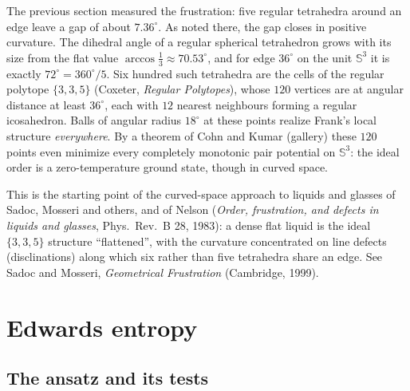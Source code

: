 \documentclass[11pt,openany]{book}
\theoremstyle{plain}
\theoremstyle{definition}
\theoremstyle{remark}
\newcommand{\Sph}{\mathbb{S}}          %
\begin{document}
The previous section measured the frustration: five regular tetrahedra around an edge leave a gap of
about $7.36^\circ$. As noted there, the gap closes in positive curvature. The dihedral angle of a regular
spherical tetrahedron grows with its size from the flat value $\arccos\frac13\approx70.53^\circ$, and for
edge $36^\circ$ on the unit $\Sph^3$ it is exactly $72^\circ=360^\circ/5$. Six hundred such tetrahedra are the cells of the
regular polytope $\{3,3,5\}$ (Coxeter, \emph{Regular Polytopes}), whose $120$ vertices are at angular
distance at least $36^\circ$, each with $12$ nearest neighbours forming a regular icosahedron. Balls of
angular radius $18^\circ$ at these points realize Frank's local structure \emph{everywhere}. By a theorem of
Cohn and Kumar (gallery) these $120$ points even minimize every completely monotonic pair potential on
$\Sph^3$: the ideal order is a zero-temperature ground state, though in curved space.

This is the starting point of the curved-space approach to liquids and glasses of Sadoc, Mosseri and
others, and of Nelson (\emph{Order, frustration, and defects in liquids and glasses}, Phys.\ Rev.~B 28,
1983): a dense flat liquid is the ideal $\{3,3,5\}$ structure ``flattened'', with the curvature
concentrated on line defects (disclinations) along which six rather than five tetrahedra share an edge.
See Sadoc and Mosseri, \emph{Geometrical Frustration} (Cambridge, 1999).

\section{Edwards entropy}
\label{SM:sec:edwards}

\subsection{The ansatz and its tests}
\end{document}
